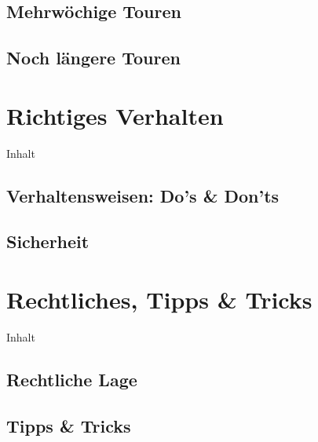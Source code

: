 \documentclass{beamer}
\begin{document}
		\subsection{Mehrwöchige Touren}
			
			\begin{frame}{}
			\end{frame}
		
		\subsection{Noch längere Touren}
			
			\begin{frame}{}
			\end{frame}
	
	\section{Richtiges Verhalten}
		
		\begin{frame}[t]{Inhalt}
		\end{frame}
		
		\subsection{Verhaltensweisen: Do's \& Don'ts}
			
			\begin{frame}{}
			\end{frame}
			
		\subsection{Sicherheit}
			
			\begin{frame}{}
			\end{frame}
	
	\section{Rechtliches, Tipps \& Tricks}
		
		\begin{frame}[t]{Inhalt}
		\end{frame}
	
		\subsection{Rechtliche Lage}
			
			\begin{frame}{}
			\end{frame}
		
		\subsection{Tipps \& Tricks}
\end{document}
